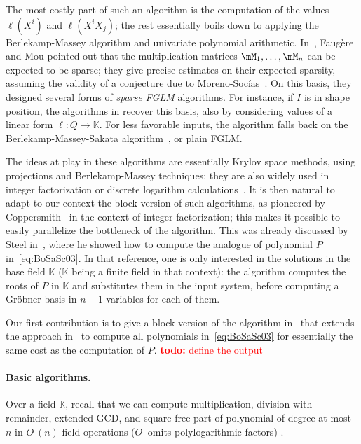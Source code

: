 \documentclass[12pt]{article}
\newcommand{\todo}[1]{\textcolor{red}{{\bf todo:} #1}}
\def\K{\mathbb{K}}
\def\K {\ensuremath{\mathbb{K}}}
\begin{document}
The most costly part of such an algorithm is the computation of the
values $\ell(X^i)$ and $\ell(X^i X_j)$; the rest essentially boils
down to applying the Berlekamp-Massey algorithm and univariate
polynomial arithmetic. In~\cite{FaMo17}, Faug{\`e}re and Mou pointed
out that the multiplication matrices $\mM_1,\dots,\mM_n$ can be
expected to be sparse; they give precise estimates on their expected
sparsity, assuming the validity of a conjecture due to
Moreno-Soc\'ias~\cite{MorenoSocias91}. 
On this basis, they designed several forms of {\em sparse FGLM}
algorithms. For instance, if $I$ is in shape position, the algorithms
in \cite{FaMo17} recover this basis, also by considering values of
a linear form $\ell:Q \to \K$. For less favorable inputs, the algorithm
falls back on the Berlekamp-Massey-Sakata algorithm~\cite{Sakata90},
or plain FGLM.

The ideas at play in these algorithms are essentially Krylov space
methods, using projections and Berlekamp-Massey techniques; they are
also widely used in integer factorization or discrete logarithm
calculations~\cite{xxx,yyy}. It is then natural to adapt to our
context the block version of such algorithms, as pioneered by
Coppersmith~\cite{Coppersmith94} in the context of integer
factorization; this makes it possible to easily parallelize the
bottleneck of the algorithm. This was already discussed by Steel
in~\cite{Steel15}, where he showed how to compute the analogue of
polynomial $P$ in~\eqref{eq:BoSaSc03}. In that reference, one is
only interested in the solutions in the base field $\K$ ($\K$ being a
finite field in that context): the algorithm computes the roots of $P$
in $\K$ and substitutes them in the input system, before computing a
Gr\"obner basis in $n-1$ variables for each of them.

Our first contribution is to give a block version of
the algorithm in~\cite{BoSaSc03} that extends the approach
in~\cite{Steel15} to compute all polynomials in~\eqref{eq:BoSaSc03}
for essentially the same cost as the computation of $P$.
\todo{define the output}

\paragraph{Basic algorithms.}
Over a field $\mathbb{K}$, recall that we can compute
multiplication, division with remainder, extended GCD, and square
free part of polynomial of degree at most $n$ in $O^{\tilde{~}}(n)$
field operations ($O^{\tilde{~}}$ omits polylogarithmic factors)
\cite{GaGe13}.
\end{document}
